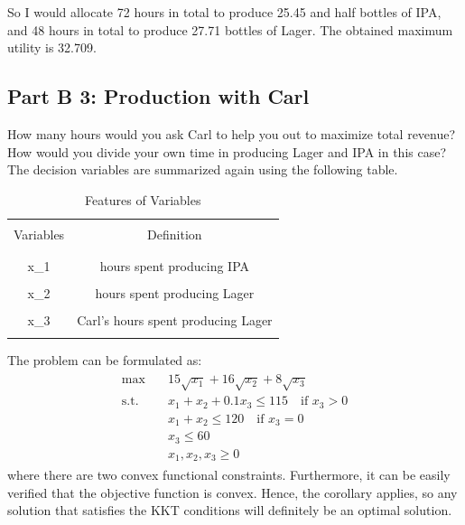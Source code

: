 \documentclass[fleqn,10pt]{wlscirep}
\begin{document}
So I would allocate 72 hours in total to produce 25.45 and half bottles of IPA, and 48 hours in total to produce 27.71 bottles of Lager. The obtained maximum utility is 32.709.

\subsection{Part B 3: Production with Carl}

How many hours would you ask Carl to help you out to maximize total revenue? How would you divide your own time in producing Lager and IPA in this case? The decision variables are summarized again using the following table.

\begin{table}[ht]
    \centering
    \begin{tabular}{C C}
        \hline
        \\[-1em]
        Variables & Definition \\
        \\[-1em]
        \hline
        \\[-1em]
        x_{1} & hours spent producing IPA \\
        \\[-1em]
        x_{2} & hours spent producing Lager \\
        \\[-1em]
        x_{3} & Carl's hours spent producing Lager \\
        \\[-1em]
        \hline
    \end{tabular}
    \caption{Features of Variables}
    \label{tab:1}
\end{table}
\FloatBarrier

The problem can be formulated as:
\begin{align} \begin{split}
    \max \quad & 15 \sqrt{x_{1}} + 16 \sqrt{x_{2}} + 8 \sqrt{x_{3}} \\
    \text{s.t.} \quad & x_{1} + x_{2} + 0.1 x_{3} \leq 115 \quad \text{if  } x_{3} > 0 \\
    & x_{1} + x_{2} \leq 120 \quad \text{if  } x_{3} = 0 \\
    & x_{3} \leq 60 \\
    & x_{1}, x_{2}, x_{3} \geq 0
\end{split} \end{align} 
where there are two convex functional constraints. Furthermore, it can be easily verified that the objective function is convex. Hence, the corollary applies, so any solution that satisfies the KKT conditions will definitely be an optimal solution.
\end{document}
